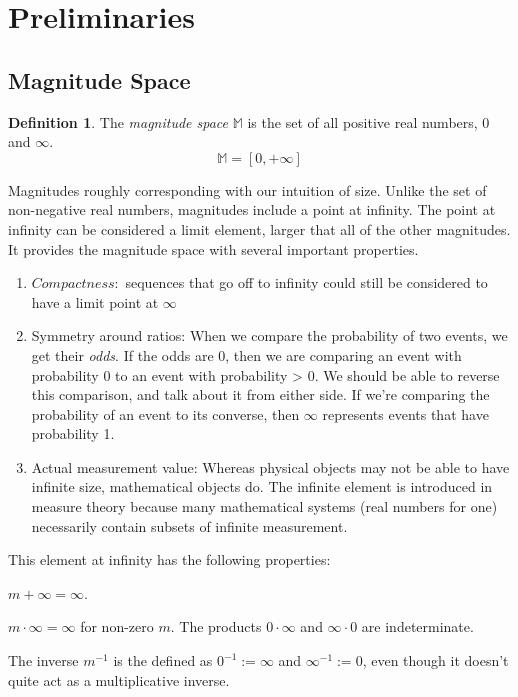 \documentclass[twoside]{article}
\theoremstyle{plain}%
\theoremstyle{definition}
\newtheorem{definition}{Definition}[section]
\theoremstyle{remark}
\begin{document}
\section{Preliminaries}
\subsection{Magnitude Space}

\begin{definition}
The \textit{magnitude space} \(\mathbb{M}\) is the set of all positive real numbers, \(0\) and \(\infty\).
\[\mathbb{M} = [0, +\infty]\]
\end{definition}

Magnitudes roughly corresponding with our intuition of size. Unlike the set of non-negative real numbers, magnitudes include a point at infinity. The point at infinity can be considered a limit element, larger that all of the other magnitudes. It provides the magnitude space with several important properties.

\begin{enumerate}
\item \(Compactness:\) sequences that go off to infinity could still be considered to have a limit point at \(\infty\)
\item Symmetry around ratios: When we compare the probability of two events, we get their \textit{odds}. If the odds are 0, then we are comparing an event with probability 0 to an event with probability > 0. We should be able to reverse this comparison, and talk about it from either side. If we're comparing the probability of an event to its converse, then \(\infty\) represents events that have probability 1.
\item Actual measurement value: Whereas physical objects may not be able to have infinite size, mathematical objects do. The infinite element is introduced in measure theory because many mathematical systems (real numbers for one) necessarily contain subsets of infinite measurement.
\end{enumerate}

This element at infinity has the following properties:

\(m + \infty = \infty\).

\(m \cdot \infty = \infty\) for non-zero \(m\). The products \(0 \cdot \infty\) and \(\infty \cdot 0\) are indeterminate.

The inverse \(m^{-1}\) is the defined as \(0^{-1} := \infty\) and \(\infty^{-1} := 0\), even though it doesn't quite act as a multiplicative inverse.
\end{document}
